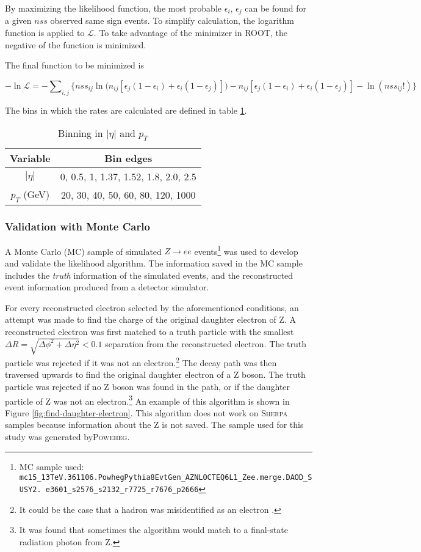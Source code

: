 By maximizing the likelihood function, the most probable $\epsilon_i$, $\epsilon_j$ can be found for a given $nss$ observed same sign events. To simplify calculation, the logarithm function is applied to $\mathcal{L}$. To take advantage of the minimizer in ROOT, the negative of the function is minimized. 

The final function to be minimized is 

\begin{equation}
-\ln \mathcal{L} = -\sum\nolimits_{i,j} \Big\{ {nss}_{ij} \ln\big(n_{ij}[\epsilon_j(1-\epsilon_i) + \epsilon_i(1-\epsilon_j)]\big) - n_{ij}[\epsilon_j(1-\epsilon_i) + \epsilon_i(1-\epsilon_j)] - \ln (nss_{ij}!) \Big\}
\end{equation} 

The bins in which the rates are calculated are defined in table \ref{table:binning}.

\begin{table}[h!]
\centering
\begin{tabular}{c | c}
\textbf{Variable} & \textbf{Bin edges} \\
\hline
$|\eta|$ & 0, 0.5, 1, 1.37, 1.52, 1.8, 2.0, 2.5 \\
$p_T$ (GeV) &  20, 30, 40, 50, 60, 80, 120, 1000
\end{tabular}
\caption{Binning in $|\eta|$ and $p_T$}
\label{table:binning}
\end{table}

\subsubsection*{Validation with Monte Carlo}
A Monte Carlo (MC) sample of simulated $Z \rightarrow ee$ events\footnote{MC sample used: \texttt{mc15\_13TeV.361106.PowhegPythia8EvtGen\_AZNLOCTEQ6L1\_Zee.merge.DAOD\_SUSY2. e3601\_s2576\_s2132\_r7725\_r7676\_p2666}}  was used to develop and validate the likelihood algorithm. The information saved in the MC sample includes the \textit{truth} information of the simulated events, and the reconstructed event information produced from a detector simulator. 

For every reconstructed electron selected by the aforementioned conditions, an attempt was made to find the charge of the original daughter electron of Z. A reconstructed electron was first matched to a truth particle with the smallest $\Delta R = \sqrt{\Delta \phi^2 + \Delta \eta^2} < 0.1$ separation from the reconstructed electron. The truth particle was rejected if it was not an electron.\footnote{It could be the case that a hadron was misidentified as an electron \cite{ElectronReco2011}.} The decay path was then traversed upwards to find the original daughter electron of a Z boson. The truth particle was rejected if no Z boson was found in the path, or if the daughter particle of Z was not an electron.\footnote{It was found that sometimes the algorithm would match to a final-state radiation photon from Z.} An example of this algorithm is shown in Figure \ref{fig:find-daughter-electron}. This algorithm does not work on \textsc{Sherpa} samples because information about the Z is not saved. The sample used for this study was generated by\textsc{Poweheg}. 

